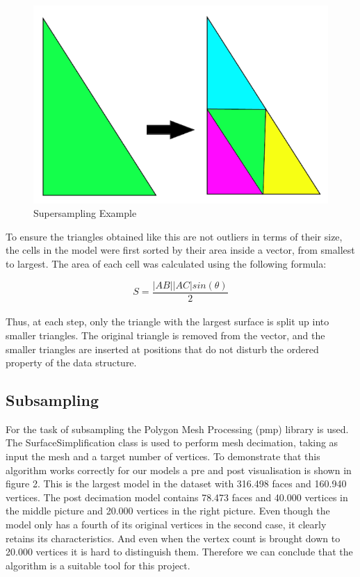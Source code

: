 \documentclass{bigdata}
\begin{document}
\begin{figure}[h!]
  \centering
  \includegraphics[width=0.5\linewidth]{Pictures/triangle.png}
  \caption{Supersampling Example}
\end{figure}


\noindent To ensure the triangles obtained like this are not outliers in terms of their size, the cells in the model were first sorted by their area inside a vector, from smallest to largest. The area of each cell was calculated using the following formula:

\begin{equation}
S = \frac{|AB||AC|sin(\theta)}{2}
\end{equation}\\

\noindent Thus, at each step, only the triangle with the largest surface is split up into smaller triangles. The original triangle is removed from the vector, and the smaller triangles are inserted at positions that do not disturb the ordered property of the data structure.

\subsection{Subsampling}
For the task of subsampling the Polygon Mesh Processing (pmp) library is used. The SurfaceSimplification class is used to perform mesh decimation, taking as input the mesh and a target number of vertices. To demonstrate that this algorithm works correctly for our models a pre and post visualisation is shown in figure 2. This is the largest model in the dataset with 316.498 faces and 160.940 vertices. The post decimation model contains 78.473 faces and 40.000 vertices in the middle picture and 20.000 vertices in the right picture. Even though the model only has a fourth of its original vertices in the second case, it clearly retains its characteristics. And even when the vertex count is brought down to 20.000 vertices it is hard to distinguish them. Therefore we can conclude that the algorithm is a suitable tool for this project.
\end{document}
